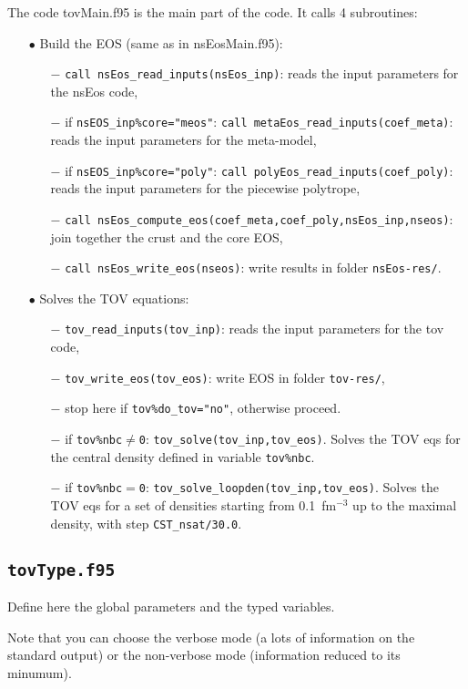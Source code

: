\documentclass[11pt]{article}
\newcommand{\code}[1]{\colorbox{light-gray}{\mbox{\texttt{#1}}}}
\begin{document}
The code tovMain.f95 is the main part of the code.
It calls 4 subroutines:
\begin{enumerate}
\item[$\bullet$] Build the EOS (same as in nsEosMain.f95):
\begin{enumerate}
\item[$-$] \code{call nsEos\_read\_inputs(nsEos\_inp)}: reads the input parameters for the nsEos code,
\item[$-$] if \code{nsEOS\_inp\%core="meos"}: \code{call metaEos\_read\_inputs(coef\_meta)}: reads the input parameters for the meta-model,
\item[$-$] if \code{nsEOS\_inp\%core="poly"}: \code{call polyEos\_read\_inputs(coef\_poly)}: reads the input parameters for the piecewise polytrope,
\item[$-$] \code{call nsEos\_compute\_eos(coef\_meta,coef\_poly,nsEos\_inp,nseos)}: join together the crust and the core EOS,
\item[$-$] \code{call nsEos\_write\_eos(nseos)}: write results in folder \code{nsEos-res/}.
\end{enumerate}
\item[$\bullet$] Solves the TOV equations: 
\begin{enumerate}
\item[$-$] \code{tov\_read\_inputs(tov\_inp)}: reads the input parameters for the tov code,
\item[$-$] \code{tov\_write\_eos(tov\_eos)}: write EOS in folder \code{tov-res/}, 
\item[$-$] stop here if \code{tov\%do\_tov="no"}, otherwise proceed.
\item[$-$] if \code{tov\%nbc$\ne$0}: \code{tov\_solve(tov\_inp,tov\_eos)}. Solves the TOV eqs for the central density defined in variable  \code{tov\%nbc}.
\item[$-$] if \code{tov\%nbc$=$0}: \code{tov\_solve\_loopden(tov\_inp,tov\_eos)}. Solves the TOV eqs for a set of densities starting from 0.1~fm$^{-3}$ up to the maximal density, with step \code{CST\_nsat/30.0}.
\end{enumerate}
\end{enumerate}


\subsection{\code{tovType.f95}}

Define here the global parameters and the typed variables.

Note that you can choose the verbose mode (a lots of information on the standard output) or the non-verbose mode (information reduced to its minumum). 
\end{document}
